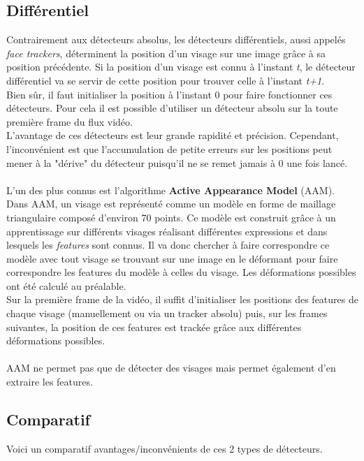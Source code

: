 \documentclass[poster]{polytech/polytech}
\begin{document}
\subsection{Différentiel}
Contrairement aux détecteurs absolus, les détecteurs différentiels, aussi appelés \textit{face trackers}, déterminent la position d'un visage sur une image grâce à sa position précédente. Si la position d'un visage est connu à l'instant \textit{t}, le détecteur différentiel va se servir de cette position pour trouver celle à l'instant \textit{t+1}.\\
Bien sûr, il faut initialiser la position à l'instant 0 pour faire fonctionner ces détecteurs. Pour cela il est possible d'utiliser un détecteur absolu sur la toute première frame du flux vidéo.\\
L'avantage de ces détecteurs est leur grande rapidité et précision. Cependant, l'inconvénient est que l'accumulation de petite erreurs sur les positions peut mener à la "dérive" du détecteur puisqu'il ne se remet jamais à 0 une fois lancé.\\
\\
L'un des plus connus est l'algorithme \textbf{Active Appearance Model} (AAM).\\
Dans AAM, un visage est représenté comme un modèle en forme de maillage triangulaire composé d'environ
70 points. Ce modèle est construit grâce à un apprentissage sur différents visages réalisant différentes expressions et dans lesquels les \textit{features} sont connus. Il va donc chercher à faire correspondre ce modèle avec tout visage se trouvant sur une image en le déformant pour faire correspondre les features du modèle à celles du visage. Les déformations possibles ont été calculé au préalable.\\
Sur la première frame de la vidéo, il suffit d'initialiser les positions des features de chaque visage (manuellement ou via un tracker absolu) puis, sur les frames suivantes, la position de ces features est trackée grâce aux différentes déformations possibles.\\
\\
AAM ne permet pas que de détecter des visages mais permet également d'en extraire les features.

\subsection{Comparatif}
Voici un comparatif avantages/inconvénients de ces 2 types de détecteurs.
\end{document}
